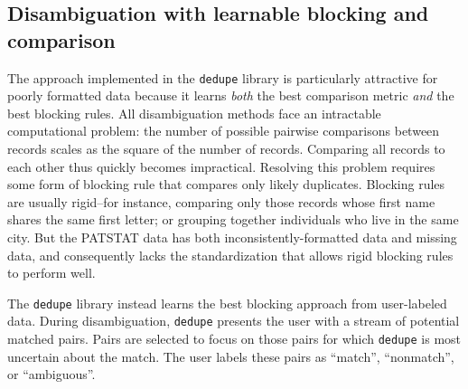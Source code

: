 \documentclass[11pt]{article}
\begin{document}

\subsection{Disambiguation with learnable blocking and comparison}
\label{sec:disamb-with-learn}

The \cite{bilenko2006learnable} approach implemented in the
\texttt{dedupe} library is particularly attractive
for poorly formatted data because it learns \textit{both} the best comparison
metric \textit{and} the best blocking rules. All disambiguation
methods face an intractable computational problem: the number of
possible pairwise comparisons between records scales
as the square of the number of records. Comparing all records to each
other thus quickly becomes impractical. Resolving this problem
requires some form of blocking rule that compares only likely
duplicates. Blocking rules are usually rigid--for instance, comparing
only those records whose first name shares the same first letter; or
grouping together individuals who live in the same city. But the
PATSTAT data has both inconsistently-formatted data and missing data,
and consequently lacks the standardization that allows rigid blocking
rules to perform well. 

The \texttt{dedupe} library instead learns the best blocking approach
from user-labeled data. During disambiguation, \texttt{dedupe}
presents the user with a stream of potential matched pairs. Pairs are
selected to focus on those pairs for which \texttt{dedupe} is most
uncertain about the match. The user labels these pairs as ``match'',
``nonmatch'', or ``ambiguous''.
\end{document}
